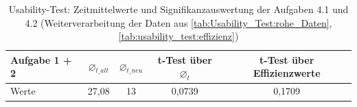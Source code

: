 \begin{table}[h]
    \centering
    \begin{tabular}{|l|c|c|c||c|}
    \hline
        Aufgabe 1 + 2 & $\varnothing_{t\_alt}$ & $\varnothing_{t\_neu}$ & t-Test über $\varnothing_t$ & t-Test über Effizienzwerte \\ \hline
        Werte & 27,08 & 13 & 0,0739 & 0,1709 \\ \hline
    \end{tabular}
    \caption{Usability-Test: Zeitmittelwerte und Signifikanzauswertung der Aufgaben 4.1 und 4.2 (Weiterverarbeitung der Daten aus \autoref{tab:Usability_Test:rohe_Daten}, \autoref{tab:usability_test:effizienz})}
    \label{tab:Usability-Test:ttest_4.1+4.2}
\end{table}